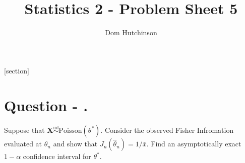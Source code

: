 \documentclass[11pt,a4paper]{article}
\begin{document}
\pagestyle{fancy}
\setlength\parindent{0pt}
\allowdisplaybreaks

\renewcommand{\headrulewidth}{0pt}

\title{Statistics 2 - Problem Sheet 5}
\author{Dom Hutchinson}
\maketitle

\fancyhead[R]{\today}

[section]

\newcommand{\dotprod}[0]{\boldsymbol{\cdot}}
\newcommand{\cosech}[0]{\mathrm{cosech}\ }
\newcommand{\cosec}[0]{\mathrm{cosec}\ }
\newcommand{\sech}[0]{\mathrm{sech}\ }
\newcommand{\prob}[0]{\mathbb{P}}
\newcommand{\nats}[0]{\mathbb{N}}
\newcommand{\cov}[0]{\mathrm{Cov}}
\newcommand{\var}[0]{\mathrm{Var}}
\newcommand{\expect}[0]{\mathbb{E}}
\newcommand{\reals}[0]{\mathbb{R}}
\newcommand{\integers}[0]{\mathbb{Z}}
\newcommand{\indicator}[0]{\mathds{1}}
\newcommand{\nb}[0]{\textit{N.B.} }
\newcommand{\ie}[0]{\textit{i.e.} }
\newcommand{\eg}[0]{\textit{e.g.} }
\newcommand{\iid}[0]{\overset{\text{iid}}{\sim} }
\newcommand{\X}[0]{\textbf{X}}
\newcommand{\x}[0]{\textbf{x}}

\newcommand{\qpart}[0]{\stepcounter{qpart} \textbf{Question \arabic{section}.\arabic{qpart}\\}}
\newcommand{\qpartt}[0]{\stepcounter{qpart} \textbf{Question \arabic{section}.\arabic{qpart}} - }
\newcommand{\ans}[0]{ \textbf{Answer \arabic{section}\\}}
\newcommand{\apart}[0]{ \textbf{Answer \arabic{section}.\arabic{qpart}\\}}
\newcommand{\apartt}[0]{\textbf{Answer \arabic{section}.\arabic{qpart}} - }
\newcommand{\question}[0]{\section*{Question - .}}

\question
Suppose that $\X\iid\text{Poisson}(\theta^*)$. Consider the observed Fisher Infromation evaluated at $\hat\theta_n$ and show that $J_n(\hat\theta_n)=1/\bar{x}$. Find an asymptotically exact $1-\alpha$ confidence interval for $\theta^*$.\\
\end{document}
